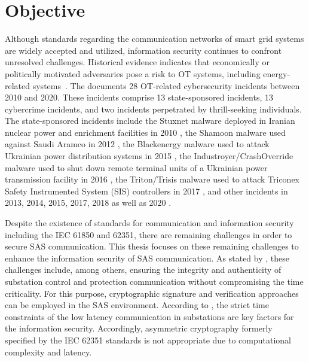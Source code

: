 \section{Objective}
\label{sec:introduction:objective}
Although standards regarding the communication networks of smart grid systems are widely accepted and utilized, information security continues to confront unresolved challenges.
Historical evidence indicates that economically or politically motivated adversaries pose a risk to OT systems, including energy-related systems~\cite{canada2021}.
The \citeauthor{canada2021} documents 28 OT-related cybersecurity incidents between 2010 and 2020.
These incidents comprise 13 state-sponsored incidents, 13 cybercrime incidents, and two incidents perpetrated by thrill-seeking individuals.
The state-sponsored incidents include the Stuxnet malware deployed in Iranian nuclear power and enrichment facilities in 2010 \cite{bbc2010}, the Shamoon malware used against Saudi Aramco in 2012 \cite{reuters2012}, the Blackenergy malware used to attack Ukrainian power distribution systems in 2015 \cite{cisa2021a}, the Industroyer/CrashOverride malware used to shut down remote terminal units of a Ukrainian power transmission facility in 2016 \cite{reuters2016,cisa2021b}, the Triton/Trisis malware used to attack Triconex Safety Instrumented System (SIS) controllers in 2017 \cite{johnson2017}, and other incidents in 2013, 2014, 2015, 2017, 2018 as well as 2020 \cite{wsj2015,cisa2018a,bsi2014,hdn2017,vice2017,cisa2018b,toi2020,warrick2020}.

Despite the existence of standards for communication and information security including the IEC 61850 and 62351, there are remaining challenges in order to secure SAS communication.
This thesis focuses on these remaining challenges to enhance the information security of SAS communication.
As stated by \citeauthor{Ishchenko2018} \cite{Ishchenko2018}, these challenges include, among others, ensuring the integrity and authenticity of substation control and protection communication without compromising the time criticality.
For this purpose, cryptographic signature and verification approaches can be employed in the SAS environment.
According to \citeauthor{Elbez2019} \cite{Elbez2019}, the strict time constraints of the low latency communication in substations are key factors for the information security.
Accordingly, asymmetric cryptography formerly specified by the IEC 62351 standards is not appropriate due to computational complexity and latency.

